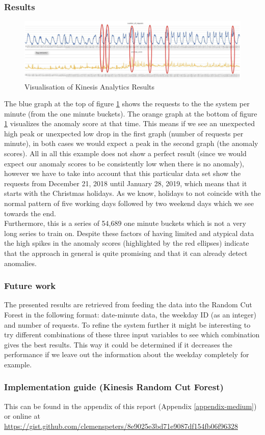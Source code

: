 \subsubsection{Results}
\begin{figure}[h]
    \centering
    \includegraphics[width=1\textwidth]{images/kinesis-results.png}
    \caption{Visualisation of Kinesis Analytics Results}
    \label{fig:medium_kinesis_results}
\end{figure}
\FloatBarrier
The blue graph at the top of figure \ref{fig:medium_kinesis_results} shows the requests to the the system per minute (from the one minute buckets). The orange graph at the bottom of figure \ref{fig:medium_kinesis_results} visualizes the anomaly score at that time. This means if we see an unexpected high peak or unexpected low drop in the first graph (number of requests per minute), in both cases we would expect a peak in the second graph (the anomaly scores). All in all this example does not show a perfect result (since we would expect our anomaly scores to be consistently low when there is no anomaly), however we have to take into account that this particular data set show the requests from December 21, 2018 until January 28, 2019, which means that it starts with the Christmas holidays. As we know, holidays to not coincide with the normal pattern of five working days followed by two weekend days which we see towards the end.\\ Furthermore, this is a series of 54,689 one minute buckets which is not a very long series to train on. Despite these factors of having limited and atypical data the high spikes in the anomaly scores (highlighted by the red ellipses) indicate that the approach in general is quite promising and that it can already detect anomalies.

\subsubsection{Future work}
The presented results are retrieved from feeding the data into the Random Cut Forest in the following format: date-minute data, the weekday ID (as an integer) and number of requests.
To refine the system further it might be interesting to try different combinations of these three input variables to see which combination gives the best results. This way it could be determined if it decreases the performance if we leave out the information about the weekday completely for example.

\subsubsection{Implementation guide (Kinesis Random Cut Forest)} 
This can be found in the appendix of this report (Appendix \ref{appendix-medium}) or online at \url{https://gist.github.com/clemenspeters/8e9025e3bd71e9087df154fb06f96328}